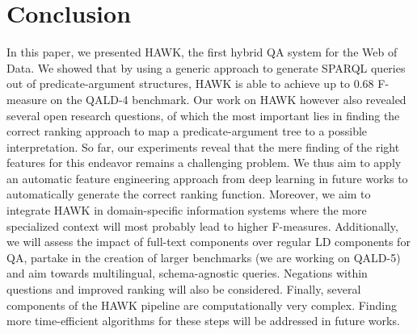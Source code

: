 \section{Conclusion}
\label{chahawk:sec:conclusion}
In this paper, we presented HAWK, the first hybrid QA system for the Web of Data. We showed that by using a generic approach to generate SPARQL queries out of predicate-argument structures, HAWK is able to achieve up to 0.68 F-measure on the QALD-4 benchmark. Our work on HAWK however also revealed several open research questions, of which the most important lies in finding the correct ranking approach to map a predicate-argument tree to a possible interpretation. So far, our experiments reveal that the mere finding of the right features for this endeavor remains a challenging problem. We thus aim to apply an automatic feature engineering approach from deep learning in future works to automatically generate the correct ranking function. Moreover, we aim to integrate HAWK in domain-specific information systems where the more specialized context will most probably lead to higher F-measures. Additionally, we will assess the impact of full-text components over regular LD components for QA, partake in the creation of larger benchmarks (we are working on QALD-5) and aim towards multilingual, schema-agnostic queries. Negations within questions and improved ranking will also be considered. Finally, several components of the HAWK pipeline are computationally very complex. Finding more time-efficient algorithms for these steps will be addressed in future works.

